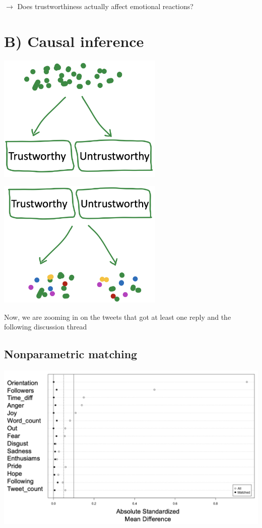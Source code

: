 \documentclass[
  letterpaper,
  DIV=11,
  numbers=noendperiod]{scrartcl}
\begin{document}
\(\rightarrow\) Does trustworthiness actually affect emotional
reactions?

\hypertarget{b-causal-inference}{%
\section{B) Causal inference}\label{b-causal-inference}}

\includegraphics[width=3.125in,height=\textheight]{images/randomization.png}

\includegraphics[width=3.125in,height=\textheight]{images/matching.png}

Now, we are zooming in on the tweets that got at least one reply and the
following discussion thread

\hypertarget{nonparametric-matching}{%
\subsection{Nonparametric matching}\label{nonparametric-matching}}

\includegraphics[width=7.29167in,height=\textheight]{images/mahalanobis_plot_wd.png}
\end{document}
